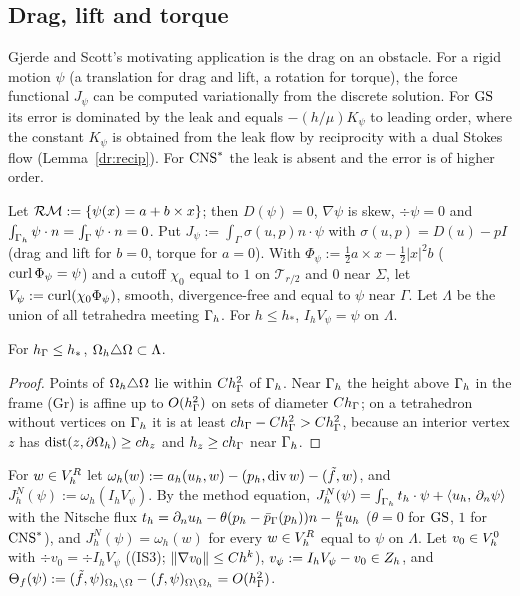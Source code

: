 \subsection{Drag, lift and torque}
Gjerde and Scott's motivating application is the drag on an obstacle. For a rigid motion $\psi$ (a translation for drag and lift, a rotation for torque), the force functional $J_\psi$ can be computed variationally from the discrete solution. For $\mathrm{GS}$ its error is dominated by the leak and equals $-(h/\mu)K_\psi$ to leading order, where the constant $K_\psi$ is obtained from the leak flow by reciprocity with a dual Stokes flow (Lemma~\ref{dr:recip}). For $\mathrm{CNS}^\ast$ the leak is absent and the error is of higher order.

Let $\mathcal{RM}:=\{\psi(x)=a+b\times x\}$; then $D(\psi)=0$, $\nabla\psi$ is skew, $\div\psi=0$ and $\int_{\Gamma_h}\psi\cdot n=\int_\Gamma\psi\cdot n=0$. Put $J_\psi:=\int_\Gamma\sigma(u,p)n\cdot\psi$ with $\sigma(u,p)=D(u)-pI$ (drag and lift for $b=0$, torque for $a=0$). With $\Phi_\psi:=\frac12a\times x-\frac12|x|^2b$ ($\operatorname{curl}\Phi_\psi=\psi$) and a cutoff $\chi_0$ equal to $1$ on $\mathcal T_{r/2}$ and $0$ near $\Sigma$, let $V_\psi:=\operatorname{curl}(\chi_0\Phi_\psi)$, smooth, divergence-free and equal to $\psi$ near $\Gamma$. Let $\Lambda$ be the union of all tetrahedra meeting $\Gamma_h$. For $h\le h_\ast$, $I_hV_\psi=\psi$ on $\Lambda$.

\begin{lemma}\label{dr:strip}
For $h_\Gamma\le h_\ast$, $\Omega_h\triangle\Omega\subset\Lambda$.
\end{lemma}
\begin{proof}
Points of $\Omega_h\triangle\Omega$ lie within $Ch_\Gamma^2$ of $\Gamma_h$. Near $\Gamma_h$ the height above $\Gamma_h$ in the frame (Gr) is affine up to $O(h_\Gamma^2)$ on sets of diameter $Ch_\Gamma$; on a tetrahedron without vertices on $\Gamma_h$ it is at least $ch_\Gamma-Ch_\Gamma^2>Ch_\Gamma^2$, because an interior vertex $z$ has $\operatorname{dist}(z,\partial\Omega_h)\ge ch_z$ and $h_z\ge ch_\Gamma$ near $\Gamma_h$.
\end{proof}

\begin{definition}\label{dr:def}
For $w\in V_h^R$ let $\omega_h(w):=a_h(u_h,w)-(p_h,\operatorname{div} w)-(\tilde f,w)$, and $J^N_h(\psi):=\omega_h(I_hV_\psi)$. By the method equation, $J^N_h(\psi)=\int_{\Gamma_h}t_h\cdot\psi+\langle u_h,\, \partial_n\psi\rangle$ with the Nitsche flux $t_h=\partial_n u_h-\theta(p_h-\bar p_{\Gamma}(p_h))n-\frac\mu hu_h$ ($\theta=0$ for $\mathrm{GS}$, $1$ for $\mathrm{CNS}^\ast$), and $J^N_h(\psi)=\omega_h(w)$ for every $w\in V_h^R$ equal to $\psi$ on $\Lambda$. Let $v_0\in V_h^0$ with $\div v_0=\div I_hV_\psi$ ((IS3); $\lVert \nabla v_0\rVert\le Ch^k$), $v_\psi:=I_hV_\psi-v_0\in Z_h$, and $\Theta_f(\psi):=(\tilde f,\psi)_{\Omega_h\setminus\Omega}-(f,\psi)_{\Omega\setminus\Omega_h}=O(h_\Gamma^2)$.
\end{definition}

